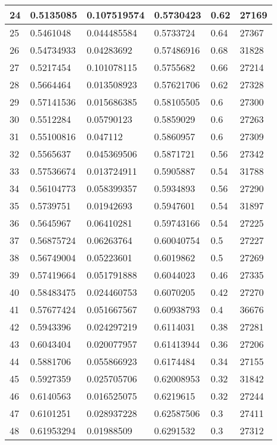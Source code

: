 \begin{longtable}{|l|l|l|l|l|l|}
24 & 0.5135085 & 0.107519574 & 0.5730423 & 0.62 & 27169 \\ \hline 
25 & 0.5461048 & 0.044485584 & 0.5733724 & 0.64 & 27367 \\ \hline 
26 & 0.54734933 & 0.04283692 & 0.57486916 & 0.68 & 31828 \\ \hline 
27 & 0.5217454 & 0.101078115 & 0.5755682 & 0.66 & 27214 \\ \hline 
28 & 0.5664464 & 0.013508923 & 0.57621706 & 0.62 & 27328 \\ \hline 
29 & 0.57141536 & 0.015686385 & 0.58105505 & 0.6 & 27300 \\ \hline 
30 & 0.5512284 & 0.05790123 & 0.5859029 & 0.6 & 27263 \\ \hline 
31 & 0.55100816 & 0.047112 & 0.5860957 & 0.6 & 27309 \\ \hline 
32 & 0.5565637 & 0.045369506 & 0.5871721 & 0.56 & 27342 \\ \hline 
33 & 0.57536674 & 0.013724911 & 0.5905887 & 0.54 & 31788 \\ \hline 
34 & 0.56104773 & 0.058399357 & 0.5934893 & 0.56 & 27290 \\ \hline 
35 & 0.5739751 & 0.01942693 & 0.5947601 & 0.54 & 31897 \\ \hline 
36 & 0.5645967 & 0.06410281 & 0.59743166 & 0.54 & 27225 \\ \hline 
37 & 0.56875724 & 0.06263764 & 0.60040754 & 0.5 & 27227 \\ \hline 
38 & 0.56749004 & 0.05223601 & 0.6019862 & 0.5 & 27269 \\ \hline 
39 & 0.57419664 & 0.051791888 & 0.6044023 & 0.46 & 27335 \\ \hline 
40 & 0.58483475 & 0.024460753 & 0.6070205 & 0.42 & 27270 \\ \hline 
41 & 0.57677424 & 0.051667567 & 0.60938793 & 0.4 & 36676 \\ \hline 
42 & 0.5943396 & 0.024297219 & 0.6114031 & 0.38 & 27281 \\ \hline 
43 & 0.6043404 & 0.020077957 & 0.61413944 & 0.36 & 27206 \\ \hline 
44 & 0.5881706 & 0.055866923 & 0.6174484 & 0.34 & 27155 \\ \hline 
45 & 0.5927359 & 0.025705706 & 0.62008953 & 0.32 & 31842 \\ \hline 
46 & 0.6140563 & 0.016525075 & 0.6219615 & 0.32 & 27244 \\ \hline 
47 & 0.6101251 & 0.028937228 & 0.62587506 & 0.3 & 27411 \\ \hline 
48 & 0.61953294 & 0.01988509 & 0.6291532 & 0.3 & 27312 \\ \hline 

\end{longtable}
